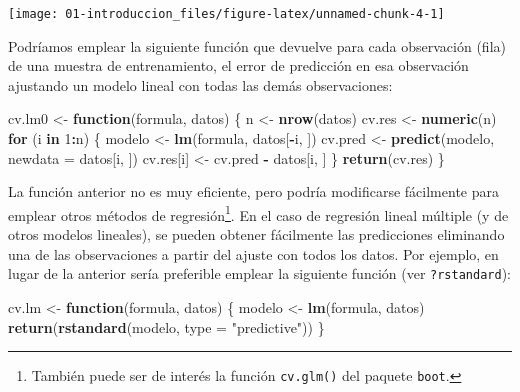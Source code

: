 \documentclass[
]{book}
\newenvironment{Shaded}{\begin{snugshade}}{\end{snugshade}}
\newcommand{\ControlFlowTok}[1]{\textcolor[rgb]{0.13,0.29,0.53}{\textbf{#1}}}
\newcommand{\DataTypeTok}[1]{\textcolor[rgb]{0.13,0.29,0.53}{#1}}
\newcommand{\DecValTok}[1]{\textcolor[rgb]{0.00,0.00,0.81}{#1}}
\newcommand{\KeywordTok}[1]{\textcolor[rgb]{0.13,0.29,0.53}{\textbf{#1}}}
\newcommand{\NormalTok}[1]{#1}
\newcommand{\OperatorTok}[1]{\textcolor[rgb]{0.81,0.36,0.00}{\textbf{#1}}}
\newcommand{\StringTok}[1]{\textcolor[rgb]{0.31,0.60,0.02}{#1}}
\theoremstyle{break}
\theoremstyle{definition}
\theoremstyle{definition}
\theoremstyle{definition}
\theoremstyle{remark}
\begin{document}
\begin{center}\texttt{[image: 01-introduccion\_files/figure-latex/unnamed-chunk-4-1]} \end{center}

Podríamos emplear la siguiente función que devuelve para cada observación (fila) de una muestra de entrenamiento, el error de predicción en esa observación ajustando un modelo lineal con todas las demás observaciones:

\begin{Shaded}
\begin{Highlighting}[]
\NormalTok{cv.lm0 <-}\StringTok{ }\ControlFlowTok{function}\NormalTok{(formula, datos) \{}
\NormalTok{    n <-}\StringTok{ }\KeywordTok{nrow}\NormalTok{(datos)}
\NormalTok{    cv.res <-}\StringTok{ }\KeywordTok{numeric}\NormalTok{(n)}
    \ControlFlowTok{for}\NormalTok{ (i }\ControlFlowTok{in} \DecValTok{1}\OperatorTok{:}\NormalTok{n) \{}
\NormalTok{        modelo <-}\StringTok{ }\KeywordTok{lm}\NormalTok{(formula, datos[}\OperatorTok{-}\NormalTok{i, ])}
\NormalTok{        cv.pred <-}\StringTok{ }\KeywordTok{predict}\NormalTok{(modelo, }\DataTypeTok{newdata =}\NormalTok{ datos[i, ])}
\NormalTok{        cv.res[i] <-}\StringTok{ }\NormalTok{cv.pred }\OperatorTok{-}\StringTok{ }\NormalTok{datos[i, ]}
\NormalTok{    \}}
    \KeywordTok{return}\NormalTok{(cv.res)}
\NormalTok{\}}
\end{Highlighting}
\end{Shaded}

La función anterior no es muy eficiente, pero podría modificarse fácilmente para emplear otros métodos de regresión\footnote{También puede ser de interés la función \texttt{cv.glm()} del paquete \texttt{boot}.}.
En el caso de regresión lineal múltiple (y de otros modelos lineales), se pueden obtener fácilmente las predicciones eliminando una de las observaciones a partir del ajuste con todos los datos.
Por ejemplo, en lugar de la anterior sería preferible emplear la siguiente función (ver \texttt{?rstandard}):

\begin{Shaded}
\begin{Highlighting}[]
\NormalTok{cv.lm <-}\StringTok{ }\ControlFlowTok{function}\NormalTok{(formula, datos) \{}
\NormalTok{    modelo <-}\StringTok{ }\KeywordTok{lm}\NormalTok{(formula, datos)}
    \KeywordTok{return}\NormalTok{(}\KeywordTok{rstandard}\NormalTok{(modelo, }\DataTypeTok{type =} \StringTok{"predictive"}\NormalTok{))}
\NormalTok{\}}
\end{Highlighting}
\end{Shaded}
\end{document}
